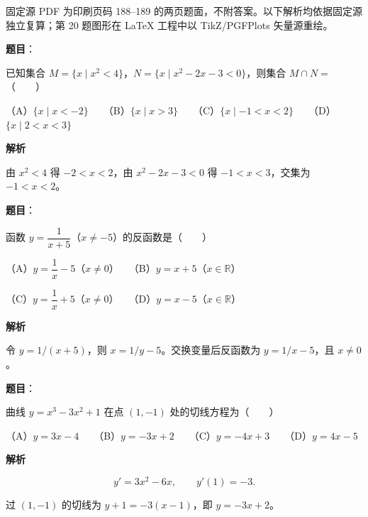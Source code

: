 

\begin{gktip}
固定源 PDF 为印刷页码 188–189 的两页题面，不附答案。以下解析均依据固定源独立复算；第 20 题图形在 LaTeX 工程中以 TikZ/PGFPlots 矢量源重绘。
\end{gktip}

\begin{answer}

\textbf{题目}：

已知集合 $M=\{x\mid x^2<4\}$，$N=\{x\mid x^2-2x-3<0\}$，则集合 $M\cap N=$\mbox{（　　）}

（A）$\{x\mid x<-2\}$　　（B）$\{x\mid x>3\}$　　（C）$\{x\mid-1<x<2\}$　　（D）$\{x\mid2<x<3\}$

\textbf{解析}

由 $x^2<4$ 得 $-2<x<2$，由 $x^2-2x-3<0$ 得 $-1<x<3$，交集为 $-1<x<2$。


\end{answer}
\begin{answer}

\textbf{题目}：

函数 $y=\dfrac1{x+5}$（$x\ne-5$）的反函数是\mbox{（　　）}

（A）$y=\dfrac1x-5$（$x\ne0$）　　（B）$y=x+5$（$x\in\mathbb R$）

（C）$y=\dfrac1x+5$（$x\ne0$）　　（D）$y=x-5$（$x\in\mathbb R$）

\textbf{解析}

令 $y=1/(x+5)$，则 $x=1/y-5$。交换变量后反函数为 $y=1/x-5$，且 $x\ne0$。


\end{answer}
\begin{answer}

\textbf{题目}：

曲线 $y=x^3-3x^2+1$ 在点 $(1,-1)$ 处的切线方程为\mbox{（　　）}

（A）$y=3x-4$　　（B）$y=-3x+2$　　（C）$y=-4x+3$　　（D）$y=4x-5$

\textbf{解析}

\nopagebreak[4]
\[
y'=3x^2-6x,
\qquad y'(1)=-3.
\]

过 $(1,-1)$ 的切线为 $y+1=-3(x-1)$，即 $y=-3x+2$。


\end{answer}
